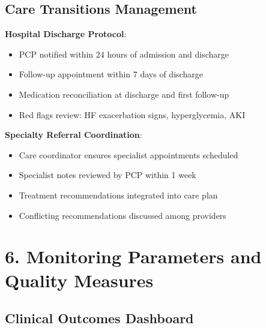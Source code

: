 \documentclass[11pt,letterpaper]{article}
\begin{document}
\subsection*{Care Transitions Management}

\textbf{Hospital Discharge Protocol}:
\begin{itemize}[leftmargin=*]
    \item PCP notified within 24 hours of admission and discharge
    \item Follow-up appointment within 7 days of discharge
    \item Medication reconciliation at discharge and first follow-up
    \item Red flags review: HF exacerbation signs, hyperglycemia, AKI
\end{itemize}

\textbf{Specialty Referral Coordination}:
\begin{itemize}[leftmargin=*]
    \item Care coordinator ensures specialist appointments scheduled
    \item Specialist notes reviewed by PCP within 1 week
    \item Treatment recommendations integrated into care plan
    \item Conflicting recommendations discussed among providers
\end{itemize}

\section*{6. Monitoring Parameters and Quality Measures}

\subsection*{Clinical Outcomes Dashboard}
\end{document}
